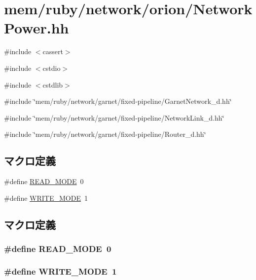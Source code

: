 \hypertarget{NetworkPower_8hh}{
\section{mem/ruby/network/orion/NetworkPower.hh}
\label{NetworkPower_8hh}
}
{\ttfamily \#include $<$cassert$>$}\par
{\ttfamily \#include $<$cstdio$>$}\par
{\ttfamily \#include $<$cstdlib$>$}\par
{\ttfamily \#include \char`\"{}mem/ruby/network/garnet/fixed-\/pipeline/GarnetNetwork\_\-d.hh\char`\"{}}\par
{\ttfamily \#include \char`\"{}mem/ruby/network/garnet/fixed-\/pipeline/NetworkLink\_\-d.hh\char`\"{}}\par
{\ttfamily \#include \char`\"{}mem/ruby/network/garnet/fixed-\/pipeline/Router\_\-d.hh\char`\"{}}\par
\subsection*{マクロ定義}
\begin{DoxyCompactItemize}
\item 
\#define \hyperlink{NetworkPower_8hh_a064cc7153fdb5596b2079d865dd9e055}{READ\_\-MODE}~0
\item 
\#define \hyperlink{NetworkPower_8hh_aa2fe33f497c74e0b5a72f36f121b2ef0}{WRITE\_\-MODE}~1
\end{DoxyCompactItemize}


\subsection{マクロ定義}
\hypertarget{NetworkPower_8hh_a064cc7153fdb5596b2079d865dd9e055}{
\subsubsection[{READ\_\-MODE}]{\setlength{\rightskip}{0pt plus 5cm}\#define READ\_\-MODE~0}}
\label{NetworkPower_8hh_a064cc7153fdb5596b2079d865dd9e055}
\hypertarget{NetworkPower_8hh_aa2fe33f497c74e0b5a72f36f121b2ef0}{
\subsubsection[{WRITE\_\-MODE}]{\setlength{\rightskip}{0pt plus 5cm}\#define WRITE\_\-MODE~1}}
\label{NetworkPower_8hh_aa2fe33f497c74e0b5a72f36f121b2ef0}
